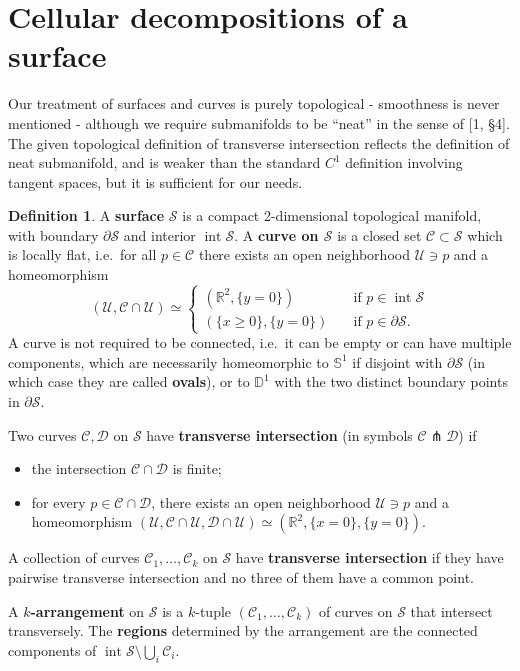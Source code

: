 \documentclass[11pt,reqno]{amsart}
\theoremstyle{plain}
\theoremstyle{definition}
\newtheorem{definition}[subsection]{Definition}
\theoremstyle{remark}
\numberwithin{equation}{subsection}
\newcommand*{\bbD}{\mathbb{D}}
\newcommand*{\bbR}{\mathbb{R}}
\newcommand*{\bbS}{\mathbb{S}}
\newcommand*{\calC}{\mathcal{C}}
\newcommand*{\calD}{\mathcal{D}}
\newcommand*{\calS}{\mathcal{S}}
\newcommand*{\calU}{\mathcal{U}}
\DeclareMathOperator{\interior}{int}
\begin{document}
\section{Cellular decompositions of a surface}\label{sec:cell}

Our treatment of surfaces and curves is purely topological - smoothness is never mentioned - although we require submanifolds to be ``neat'' in the sense of \cite{hirsch2012differential}[1, §4]. The given topological definition of transverse intersection reflects the definition of neat submanifold, and is weaker than the standard $C^1$ definition involving tangent spaces, but it is sufficient for our needs.

\begin{definition}
    A \textbf{surface} $\calS$ is a compact 2-dimensional topological manifold, with boundary $\partial\calS$ and interior $\interior\calS$. A \textbf{curve on $\calS$} is a closed set $\calC\subset\calS$ which is locally flat, i.e.\ for all $p\in\calC$ there exists an open neighborhood $\calU\ni p$ and a homeomorphism
    \[(\calU,\calC\cap\calU)\simeq
        \begin{cases}
            (\bbR^2,\{y=0\})&\quad\text{if $p\in\interior\calS$}\\
            (\{x\ge0\},\{y=0\})&\quad\text{if $p\in\partial\calS$}.
        \end{cases}\]
    A curve is not required to be connected, i.e.\ it can be empty or can have multiple components, which are necessarily homeomorphic to $\bbS^1$ if disjoint with $\partial\calS$ (in which case they are called \textbf{ovals}), or to $\bbD^1$ with the two distinct boundary points in $\partial\calS$.

    Two curves $\calC,\calD$ on $\calS$ have \textbf{transverse intersection} (in symbols $\calC\pitchfork\calD$) if
    \begin{itemize}
        \item the intersection $\calC\cap\calD$ is finite;
        \item for every $p\in\calC\cap\calD$, there exists an open neighborhood $\calU\ni p$ and a homeomorphism $(\calU,\calC\cap\calU,\calD\cap\calU)\simeq(\bbR^2,\{x=0\},\{y=0\})$.
    \end{itemize}
    A collection of curves $\calC_1,\dots,\calC_k$ on $\calS$ have \textbf{transverse intersection} if they have pairwise transverse intersection and no three of them have a common point.

    A \textbf{$k$-arrangement} on $\calS$ is a $k$-tuple $(\calC_1,\dots,\calC_k)$ of curves on $\calS$ that intersect transversely. The \textbf{regions} determined by the arrangement are the connected components of $\interior\calS\setminus\bigcup_i\calC_i$.
\end{definition}
\end{document}
